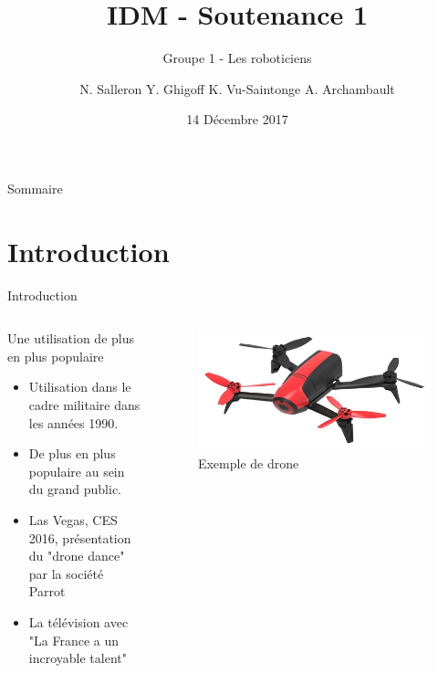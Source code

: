 \documentclass{bredelebeamer}
\title[Ingéniere dirigée par les Modéles]{IDM - Soutenance 1}
\subtitle{Groupe 1 - Les roboticiens}
\author{N. Salleron Y. Ghigoff K. Vu-Saintonge A. Archambault}
\date{14 Décembre 2017}
\begin{document}
\begin{frame}
  \titlepage
\end{frame}

\begin{frame}{Sommaire}
  \tableofcontents
\end{frame}

\section{Introduction}

\begin{frame}{Introduction}
\begin{columns}
\begin{column}{0.5\textwidth}
\begin{block}{Une utilisation de plus en plus populaire}
\begin{itemize}
\item Utilisation dans le cadre militaire dans les années 1990.
\item De plus en plus populaire au sein du grand public.
\item Las Vegas, CES 2016, présentation du "drone dance" par la société Parrot
\item La télévision avec "La France a un incroyable talent"
\end{itemize}
\end{block}
\end{column}
\begin{column}{0.5\textwidth}
\begin{figure}
\centering
\includegraphics[scale=0.15]{images/img1.jpg}
\caption{Exemple de drone}
\end{figure}
\end{column}
\end{columns}
\end{frame}
\end{document}
